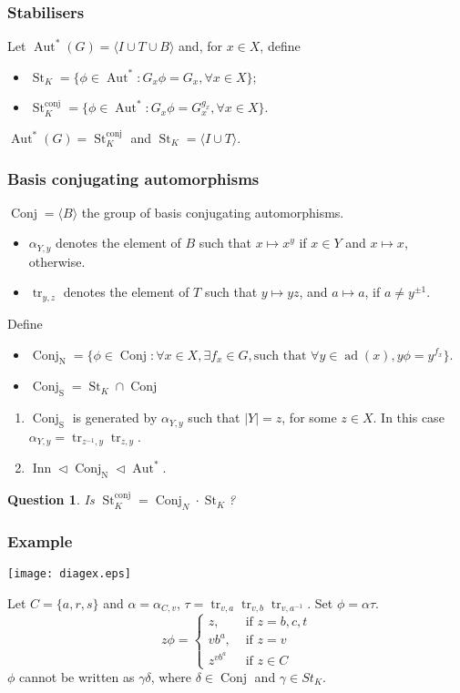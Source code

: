 \documentclass{beamer}
\newcommand{\la}{\langle}
\newcommand{\ra}{\rangle}
\def\g{\gamma }
\def\a{\alpha }
\def\t{\tau }
\newcommand{\ad}{{\operatorname{ad}}}
\newcommand{\Aut}{\operatorname{Aut}}
\newcommand{\conj}{\operatorname{conj}}
\newcommand{\St}{\operatorname{St}}
\newcommand{\cSt}{\St^{\conj}}
\newcommand{\Inn}{\operatorname{Inn}}
\newcommand{\tr}{\operatorname{tr}}
\newcommand{\Conj}{\operatorname{Conj}}
\newcommand{\NConj}{\Conj_{\operatorname{N}}}
\newcommand{\sConj}{\Conj_{\operatorname{S}}}
\newcommand{\be}{\begin{enumerate}}
\newcommand{\ee}{\end{enumerate}}
\newcommand{\bei}{\begin{itemize}}
\newcommand{\eei}{\end{itemize}}
\newtheorem{delusion}[theorem]{{Question}}
\begin{document}
\begin{frame}
\frametitle{Stabilisers}
Let $\Aut^*(G)=\la I\cup T\cup B\ra$ and, 
for $x\in X$, define 
\begin{itemize}
\item $\St_K=\{\phi \in \Aut^*:G_x\phi =G_x, \forall x\in X\}$;\pause
\item $\cSt_K=\{\phi \in \Aut^*:G_x\phi=G_x^{g_x}, \forall x\in X\}$.\pause
\end{itemize}


\begin{theorem}
$\Aut^*(G)=\cSt_K$ and $\St_K=\la I\cup T\ra$.
\end{theorem}
\end{frame}
\begin{frame}
\frametitle{Basis conjugating automorphisms}
$\Conj=\la B\ra$ the group of basis conjugating automorphisms.\pause
\bei
\item
$\a_{Y,y}$ denotes the element of $B$ such that $x\mapsto x^y$ if 
$x\in Y$ and $x\mapsto x$, otherwise.\pause
\item
$\tr_{y,z}$ denotes the element of $T$ such that $y\mapsto yz$, and 
$a\mapsto a$,  if $a\neq y^{\pm 1}$.  
\eei  
\pause

Define  
\bei 
\item   
$\NConj=\{\phi\in \Conj : \forall x\in X, \exists f_x\in G, \textrm{
 such that } \forall y\in \ad(x), y\phi=y^{f_x} \}.$ \pause
\item $\sConj=\St_K\cap \Conj$  
\eei 
\pause

\begin{theorem}
\be
\item $\sConj$ is generated by $\a_{Y,y}$ such that $|Y|={z}$, for some 
$z\in X$. \pause In this case  $\a_{Y,y}=\tr_{z^{-1},y}\tr_{z,y}$.\pause
\item 
$\Inn\lhd \NConj\lhd \Aut^*$.
\ee
\end{theorem}
\begin{delusion}
Is 
$\cSt_K=\Conj_N\cdot \St_K$?
\end{delusion}
\end{frame}
\begin{frame}
\frametitle{Example}
\begin{center}
\texttt{[image: diagex.eps]}
\end{center}
Let $C=\{a,r,s\}$ and 
 $\a=\a_{C,v}$, $\t=\tr_{v,a}\tr_{v,b}\tr_{v,a^{-1}}$. Set 
$\phi=\a\t$. 
\begin{equation*}
z\phi=
\left\{
\begin{array}{ll}
z, & \textrm{ if } z=b, c, t\\
vb^a, &\textrm{ if } z=v\\
z^{vb^a} & \textrm{ if } z\in C
\end{array}
\right.
\end{equation*}
$\phi$ cannot be written as $\g\delta$, where $\delta\in \Conj$
and $\g\in St_K$.
\end{frame}
\end{document}
